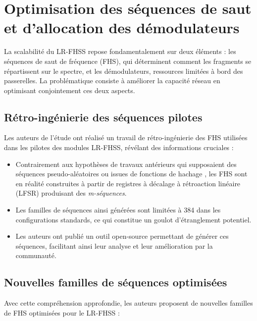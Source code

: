 \section{Optimisation des séquences de saut et d'allocation des démodulateurs}

La scalabilité du LR-FHSS repose fondamentalement sur deux éléments : les séquences de saut de fréquence (FHS), qui déterminent comment les fragments se répartissent sur le spectre, et les démodulateurs, ressources limitées à bord des passerelles. La problématique consiste à améliorer la capacité réseau en optimisant conjointement ces deux aspects.

\subsection{Rétro-ingénierie des séquences pilotes}

Les auteurs de l'étude \cite{maldonado2025enhancing} ont réalisé un travail de rétro-ingénierie des FHS utilisées dans les pilotes des modules LR-FHSS, révélant des informations cruciales :

\begin{itemize}
	\item Contrairement aux hypothèses de travaux antérieurs qui supposaient des séquences pseudo-aléatoires ou issues de fonctions de hachage \cite{lr_fhss_overview}, les FHS sont en réalité construites à partir de registres à décalage à rétroaction linéaire (LFSR) \cite{lfsr} produisant des \textit{m-séquences}.
	\item Les familles de séquences ainsi générées sont limitées à 384 dans les configurations standards, ce qui constitue un goulot d'étranglement potentiel.
	\item Les auteurs ont publié un outil open-source permettant de générer ces séquences, facilitant ainsi leur analyse et leur amélioration par la communauté.
\end{itemize}

\subsection{Nouvelles familles de séquences optimisées}

Avec cette compréhension approfondie, les auteurs proposent de nouvelles familles de FHS optimisées pour le LR-FHSS :


